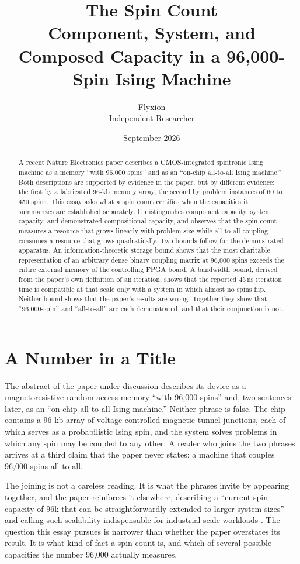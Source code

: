 \documentclass[11pt]{article}
\title{The Spin Count\\[4pt]
\large Component, System, and Composed Capacity in a 96,000-Spin Ising Machine}
\author{Flyxion\\ Independent Researcher}
\date{September 2026}
\theoremstyle{definition}
\theoremstyle{remark}
\begin{document}
\maketitle

\begin{abstract}
A recent Nature Electronics paper describes a CMOS-integrated spintronic Ising machine as a memory ``with 96,000 spins'' and as an ``on-chip all-to-all Ising machine.'' Both descriptions are supported by evidence in the paper, but by different evidence: the first by a fabricated 96-kb memory array, the second by problem instances of 60 to 450 spins. This essay asks what a spin count certifies when the capacities it summarizes are established separately. It distinguishes component capacity, system capacity, and demonstrated compositional capacity, and observes that the spin count measures a resource that grows linearly with problem size while all-to-all coupling consumes a resource that grows quadratically. Two bounds follow for the demonstrated apparatus. An information-theoretic storage bound shows that the most charitable representation of an arbitrary dense binary coupling matrix at 96,000 spins exceeds the entire external memory of the controlling FPGA board. A bandwidth bound, derived from the paper's own definition of an iteration, shows that the reported 45\,ns iteration time is compatible at that scale only with a system in which almost no spins flip. Neither bound shows that the paper's results are wrong. Together they show that ``96,000-spin'' and ``all-to-all'' are each demonstrated, and that their conjunction is not.
\end{abstract}

\section{A Number in a Title}

The abstract of the paper under discussion \cite{li2026} describes its device as a magnetoresistive random-access memory ``with 96,000 spins'' and, two sentences later, as an ``on-chip all-to-all Ising machine.'' Neither phrase is false. The chip contains a 96-kb array of voltage-controlled magnetic tunnel junctions, each of which serves as a probabilistic Ising spin, and the system solves problems in which any spin may be coupled to any other. A reader who joins the two phrases arrives at a third claim that the paper never states: a machine that couples 96,000 spins all to all.

The joining is not a careless reading. It is what the phrases invite by appearing together, and the paper reinforces it elsewhere, describing a ``current spin capacity of 96k that can be straightforwardly extended to larger system sizes'' and calling such scalability indispensable for industrial-scale workloads \cite{li2026}. The question this essay pursues is narrower than whether the paper overstates its result. It is what kind of fact a spin count is, and which of several possible capacities the number 96,000 actually measures.
\end{document}
